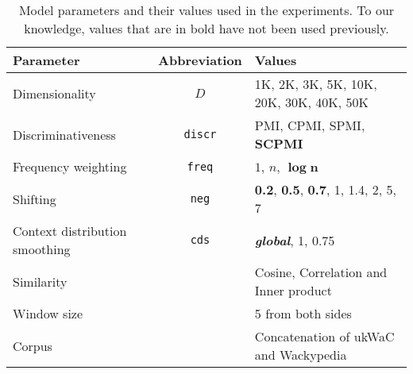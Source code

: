 \begin{table}
  \centering
  \small
  \begin{tabular}{lcl}
    \toprule
    Parameter           & Abbreviation   & Values \\
    \midrule
    Dimensionality      & $D$            & 1K, 2K, 3K, 5K, 10K, 20K, 30K, 40K, 50K \\
    Discriminativeness  & \texttt{discr} & PMI, CPMI, SPMI, \textbf{SCPMI} \\
    Frequency weighting & \texttt{freq}  & $1$, $n$, $\boldsymbol{\log n}$ \\
    Shifting            & \texttt{neg}   & \textbf{0.2}, \textbf{0.5}, \textbf{0.7}, 1, 1.4, 2, 5, 7 \\
    Context distribution smoothing       & \texttt{cds} & \textbf{\textit{global}}, 1, 0.75 \\
    Similarity          &                & Cosine, Correlation and Inner product \\
    \addlinespace
    Window size         &                & 5 from both sides                     \\
    Corpus              &                & Concatenation of ukWaC and Wackypedia \\
    \bottomrule
  \end{tabular}
  \caption[Model parameters and their values used in the experiments]{Model
    parameters and their values used in the experiments. To our knowledge,
    values that are in bold have not been used previously.}
\label{tab:parameters}
\end{table}

